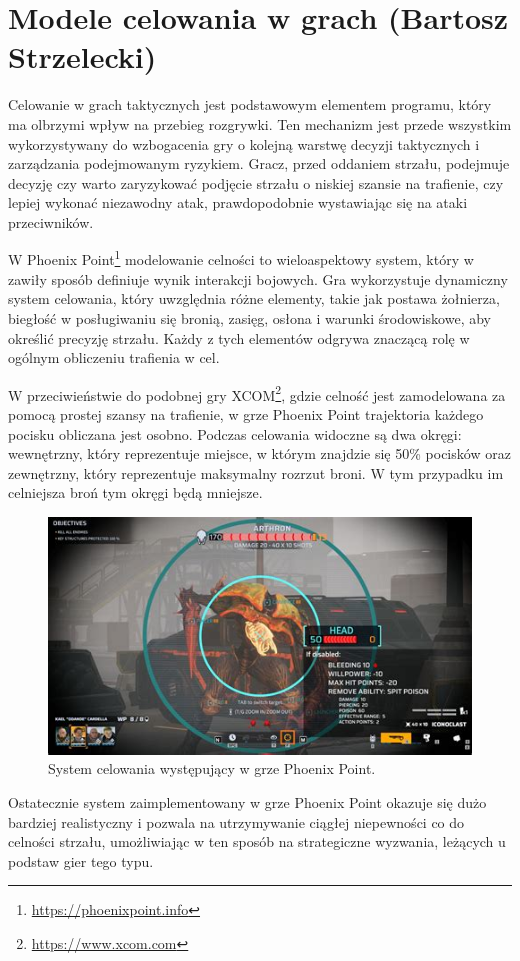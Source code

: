 \section{Modele celowania w grach (Bartosz Strzelecki)}\label{s:cel}
Celowanie w grach taktycznych jest podstawowym elementem programu, który ma
olbrzymi wpływ na przebieg rozgrywki. Ten mechanizm jest przede wszystkim wykorzystywany
do wzbogacenia gry o kolejną warstwę decyzji taktycznych i zarządzania podejmowanym ryzykiem.
Gracz, przed oddaniem strzału, podejmuje decyzję czy warto zaryzykować podjęcie strzału o niskiej szansie
na trafienie, czy lepiej wykonać niezawodny atak, prawdopodobnie wystawiając się na ataki przeciwników.

W Phoenix Point\footnote{\url{https://phoenixpoint.info}} modelowanie celności to wieloaspektowy system, który w zawiły sposób definiuje wynik interakcji bojowych. 
Gra wykorzystuje dynamiczny system celowania, który uwzględnia różne elementy, takie jak postawa żołnierza, biegłość w posługiwaniu się bronią, zasięg, 
osłona i warunki środowiskowe, aby określić precyzję strzału. Każdy z tych elementów odgrywa znaczącą rolę w ogólnym obliczeniu trafienia w cel.

W przeciwieństwie do podobnej gry XCOM\footnote{\url{https://www.xcom.com}}, gdzie celność jest zamodelowana za pomocą prostej szansy na trafienie, w grze Phoenix Point
trajektoria każdego pocisku obliczana jest osobno. Podczas celowania widoczne są dwa okręgi: wewnętrzny, który reprezentuje miejsce,
w którym znajdzie się 50\% pocisków oraz zewnętrzny, który reprezentuje maksymalny rozrzut broni. W tym przypadku im celniejsza broń tym
okręgi będą mniejsze.

\begin{figure}[h]
\centering
\includegraphics[width=1\textwidth]{images/point}
\caption{System celowania występujący w grze Phoenix Point.}
\label{fig:acc}
\end{figure}
\FloatBarrier
Ostatecznie system zaimplementowany w grze Phoenix Point okazuje się dużo bardziej realistyczny i pozwala na utrzymywanie ciągłej niepewności
co do celności strzału, umożliwiając w ten sposób na strategiczne wyzwania, leżących u podstaw gier tego typu. 
